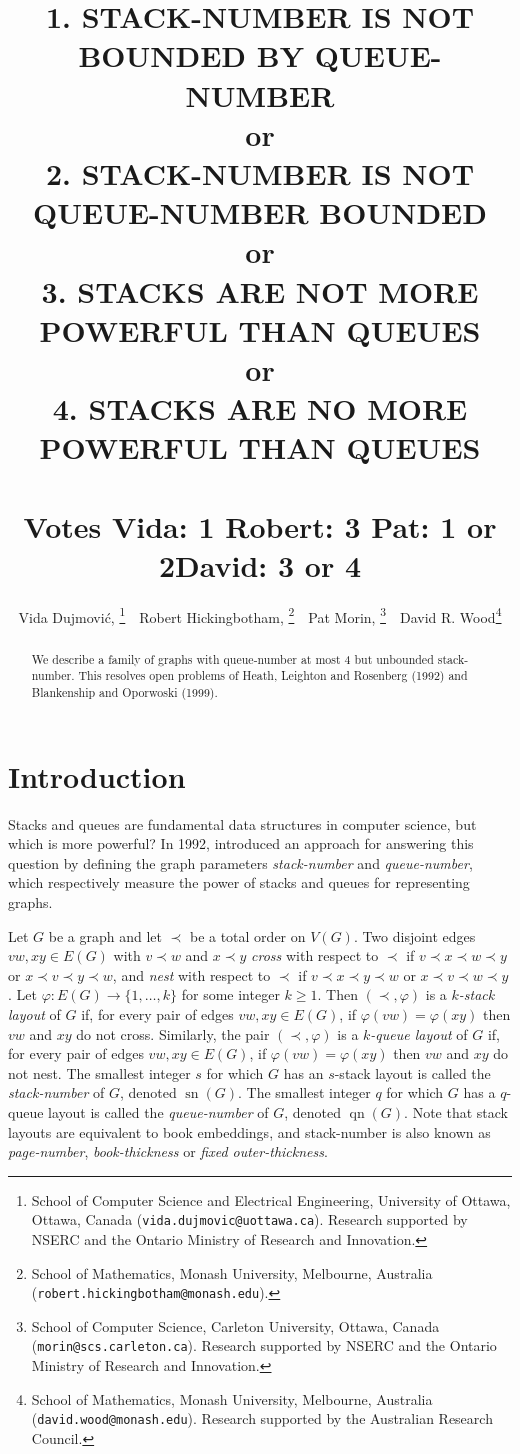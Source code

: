 \documentclass[kpfonts]{patmorin}
\title{
1. \MakeUppercase{Stack-Number is not Bounded by Queue-Number}
\\or\\
2. \MakeUppercase{Stack-Number is not Queue-Number Bounded}
\\or\\
3. STACKS ARE NOT MORE POWERFUL THAN QUEUES
\\or\\
4. STACKS ARE NO MORE POWERFUL THAN QUEUES\\~ \\
Votes \quad Vida: 1 \quad Robert: 3 \quad Pat: 1 or 2\quad  David: 3 or 4
}
\author{Vida Dujmovi\'c,\!\!%
	\thanks{School of Computer Science and Electrical Engineering,
		University of Ottawa, Ottawa, Canada (\texttt{vida.dujmovic@uottawa.ca}).
		Research supported by NSERC and the Ontario Ministry of Research and Innovation.}
	\,\,
	Robert Hickingbotham,\!\!%
	\thanks{School of Mathematics, Monash University, Melbourne, Australia (\texttt{robert.hickingbotham@monash.edu}).}
	\,\,
	Pat Morin,\!\!%
	\thanks{School of Computer Science, Carleton University, Ottawa, Canada (\texttt{morin@scs.carleton.ca}). Research  supported by NSERC and the Ontario Ministry of Research and Innovation.}
	\,\,
	David R. Wood\thanks{School of Mathematics, Monash University, Melbourne, Australia (\texttt{david.wood@monash.edu}). Research supported by the Australian Research Council.}
}
\DeclareMathOperator{\sn}{sn}
\DeclareMathOperator{\qn}{qn}
\renewcommand{\ge}{\geqslant}
\begin{document}
\maketitle
%
\begin{abstract}
We describe a family of graphs with queue-number at most 4 but unbounded stack-number. This resolves open problems of Heath, Leighton and Rosenberg (1992) and Blankenship and Oporwoski (1999).
\end{abstract}

\section{Introduction}

Stacks and queues are fundamental data structures in computer science, but which is more powerful? In 1992, \citet{HLR92} introduced an approach for answering this question by defining the graph parameters \textit{stack-number} and \textit{queue-number}, which respectively measure the power of stacks and queues for representing graphs.

Let $G$ be a graph and let $\prec$ be a total order on $V(G)$.  Two disjoint edges $vw,xy\in E(G)$ with $v\prec w$ and $x\prec y$ \emph{cross} with respect to $\prec$ if $v\prec x\prec w\prec y$ or $x\prec v\prec y\prec w$, and \emph{nest} with respect to $\prec$ if $v\prec x\prec y\prec w$ or $x\prec v\prec w\prec y$.
Let $\varphi:E(G)\to\{1,\ldots,k\}$ for some integer $k\ge 1$.  Then $(\prec,\varphi)$ is a \emph{$k$-stack layout} of $G$ if, for every pair of edges $vw,xy\in E(G)$, if $\varphi(vw) = \varphi(xy)$ then $vw$ and $xy$ do not cross. Similarly, the pair $(\prec,\varphi)$ is a \emph{$k$-queue layout} of $G$ if, for every pair of edges $vw,xy\in E(G)$, if $\varphi(vw)=\varphi(xy)$ then  $vw$ and $xy$ do not nest. The smallest integer $s$ for which $G$ has an $s$-stack layout is called the \emph{stack-number} of $G$, denoted  $\sn(G)$. The smallest integer $q$ for which $G$ has a $q$-queue layout is called the \emph{queue-number} of $G$, denoted $\qn(G)$. Note that stack layouts are equivalent to book embeddings, and stack-number is also known as \emph{page-number}, \emph{book-thickness} or \emph{fixed outer-thickness}. 
\end{document}

